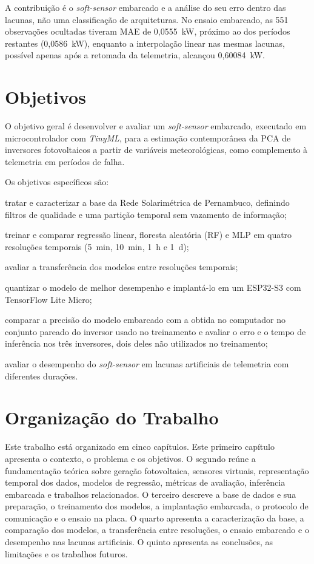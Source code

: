 A contribuição é o \textit{soft-sensor} embarcado e a análise do seu erro dentro
das lacunas, não uma classificação de arquiteturas. No ensaio embarcado, as 551
observações ocultadas tiveram MAE de 0,0555~kW, próximo ao dos períodos restantes
(0,0586~kW), enquanto a interpolação linear nas mesmas lacunas, possível apenas
após a retomada da telemetria, alcançou 0,60084~kW.

\section{Objetivos}

O objetivo geral é desenvolver e avaliar um \textit{soft-sensor} embarcado,
executado em microcontrolador com \textit{TinyML}, para a estimação contemporânea
da PCA de inversores fotovoltaicos a partir de variáveis meteorológicas, como
complemento à telemetria em períodos de falha.

Os objetivos específicos são:

\begin{alineas}
  \item tratar e caracterizar a base da Rede Solarimétrica de Pernambuco,
  definindo filtros de qualidade e uma partição temporal sem vazamento de
  informação;
  \item treinar e comparar regressão linear, floresta aleatória (RF) e MLP em
  quatro resoluções temporais (5~min, 10~min, 1~h e 1~d);
  \item avaliar a transferência dos modelos entre resoluções temporais;
  \item quantizar o modelo de melhor desempenho e implantá-lo em um ESP32-S3 com
  TensorFlow Lite Micro;
  \item comparar a precisão do modelo embarcado com a obtida no computador no
  conjunto pareado do inversor usado no treinamento e avaliar o erro e o tempo de
  inferência nos três inversores, dois deles não utilizados no treinamento;
  \item avaliar o desempenho do \textit{soft-sensor} em lacunas artificiais de
  telemetria com diferentes durações.
\end{alineas}

\section{Organização do Trabalho}

Este trabalho está organizado em cinco capítulos. Este primeiro capítulo apresenta
o contexto, o problema e os objetivos. O segundo reúne a fundamentação teórica
sobre geração fotovoltaica, sensores virtuais, representação temporal dos dados,
modelos de regressão, métricas de avaliação, inferência embarcada e trabalhos
relacionados. O terceiro descreve a base de dados e sua preparação, o treinamento
dos modelos, a implantação embarcada, o protocolo de comunicação e o ensaio na
placa. O quarto apresenta a caracterização da base, a comparação dos modelos, a
transferência entre resoluções, o ensaio embarcado e o desempenho nas lacunas
artificiais. O quinto apresenta as conclusões, as limitações e os trabalhos
futuros.
